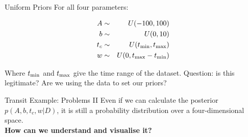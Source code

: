 \begin{frame}[t]{Uniform Priors}
For all four parameters:

\begin{eqnarray*}
A &\sim& U(-100, 100)\\
b &\sim& U(0, 10)\\
t_c &\sim& U(t_{\rm min}, t_{\rm max})\\
w &\sim& U(0, t_{\rm max} - t_{\rm min})
\end{eqnarray*}

Where $t_{\rm min}$ and $t_{\rm max}$ give the time range of the dataset.
Question: is this legitimate? Are we using the data to set our priors?

\end{frame}



\begin{frame}[fragile, t]{Transit Example: Problems II}
Even if we can calculate the posterior $p(A, b, t_c, w | D)$, it is still a
probability distribution over a four-dimensional space.\\
\vspace{20pt}
{\bf How can we understand and visualise it?}
\end{frame}




